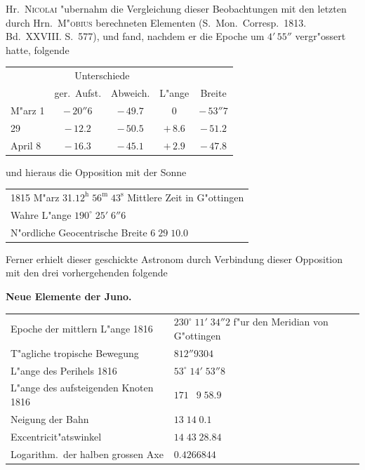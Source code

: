 \documentclass[12pt,a4paper]{article}
\begin{document}
Hr.~\textsc{Nicolai} "ubernahm die Vergleichung dieser Beobachtungen mit den letzten durch Hrn.~\textsc{M"obius}
berechneten Elementen (S.~Mon.~Corresp.~1813. Bd.~XXVIII. S.~577), und fand, nachdem er die Epoche
um $4'\,55''$ vergr"ossert hatte, folgende

\begin{center}
\begin{tabular}{l|c|c|c|c}
\toprule
& \multicolumn{2}{c|}{Unterschiede} & & \\
& ger.~Aufst. & Abweich. & L"ange & Breite \\
\midrule
M"arz 1  & $-\,20''6$ & $-\,49.7$ & $0$ & $-\,53''7$ \\
\phantom{M"arz} 29 & $-\,12.2$ & $-\,50.5$ & $+\,8.6$ & $-\,51.2$ \\
April 8 & $-\,16.3$ & $-\,45.1$ & $+\,2.9$ & $-\,47.8$ \\
\bottomrule
\end{tabular}
\end{center}

und hieraus die Opposition mit der Sonne

\begin{center}
\begin{tabular}{l}
1815 M"arz 31.\quad $12^{\mathrm{h}}\;56^{\mathrm{m}}\;43^{\mathrm{s}}$ Mittlere Zeit in G"ottingen \\
Wahre L"ange \dotfill $190^{\circ}\;25'\;6''6$ \\
N"ordliche Geocentrische Breite \dotfill $6\;29\;10.0$ \\
\end{tabular}
\end{center}

Ferner erhielt dieser geschickte Astronom durch Verbindung dieser Opposition mit den drei vorhergehenden folgende

\begin{center}
\textbf{Neue Elemente der Juno.}
\end{center}

\begin{center}
\begin{tabular}{l@{\dotfill}l}
Epoche der mittlern L"ange 1816 & $230^{\circ}\;11'\;34''2$ f"ur den Meridian von G"ottingen \\
T"agliche tropische Bewegung & $812''9304$ \\
L"ange des Perihels 1816 & $53^{\circ}\;14'\;53''8$ \\
L"ange des aufsteigenden Knoten 1816 & $171\;\phantom{0}9\;58.9$ \\
Neigung der Bahn & $13\;14\;0.1$ \\
Excentricit"atswinkel & $14\;43\;28.84$ \\
Logarithm.~der halben grossen Axe & $0.4266844$ \\
\end{tabular}
\end{center}
\end{document}
